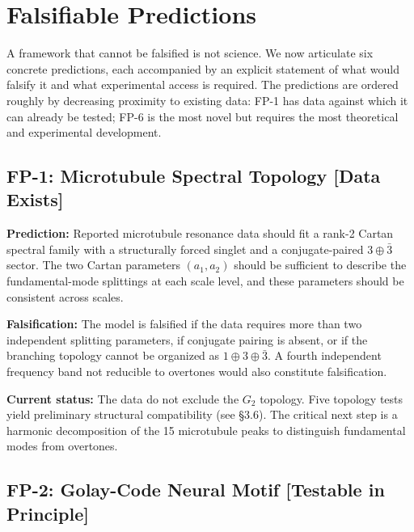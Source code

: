 \documentclass[12pt,a4paper]{article}
\begin{document}
\section{Falsifiable Predictions}

A framework that cannot be falsified is not science. We now articulate six concrete predictions, each accompanied by an explicit statement of what would falsify it and what experimental access is required. The predictions are ordered roughly by decreasing proximity to existing data: FP-1 has data against which it can already be tested; FP-6 is the most novel but requires the most theoretical and experimental development.

\subsection{FP-1: Microtubule Spectral Topology [Data Exists]}

\textbf{Prediction:} Reported microtubule resonance data \citep{Sahu2013,Singh2014,Saxena2020} should fit a rank-2 Cartan spectral family with a structurally forced singlet and a conjugate-paired $3 \oplus \bar{3}$ sector. The two Cartan parameters $(a_1, a_2)$ should be sufficient to describe the fundamental-mode splittings at each scale level, and these parameters should be consistent across scales.

\textbf{Falsification:} The model is falsified if the data requires more than two independent splitting parameters, if conjugate pairing is absent, or if the branching topology cannot be organized as $1 \oplus 3 \oplus \bar{3}$. A fourth independent frequency band not reducible to overtones would also constitute falsification.

\textbf{Current status:} The data do not exclude the $G_2$ topology. Five topology tests yield preliminary structural compatibility (see \S3.6). The critical next step is a harmonic decomposition of the 15 microtubule peaks to distinguish fundamental modes from overtones.

\subsection{FP-2: Golay-Code Neural Motif [Testable in Principle]}
\end{document}
